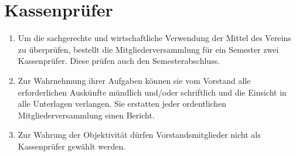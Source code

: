 \documentclass[a4paper]{scrartcl}
\begin{document}
\section{Kassenprüfer}
\begin{enumerate}
    \item Um die sachgerechte und wirtschaftliche Verwendung der Mittel des
          Vereins zu überprüfen, bestellt die Mitgliederversammlung für ein
          Semester zwei Kassenprüfer. Diese prüfen auch den Semesterabschluss.
    \item Zur Wahrnehmung ihrer Aufgaben können sie vom Vorstand alle
          erforderlichen Auskünfte mündlich und/oder schriftlich und die
          Einsicht in alle Unterlagen verlangen. Sie erstatten jeder
          ordentlichen Mitgliederversammlung einen Bericht.
    \item Zur Wahrung der Objektivität dürfen Vorstandsmitglieder nicht als
          Kassenprüfer gewählt werden.
\end{enumerate}
\end{document}
